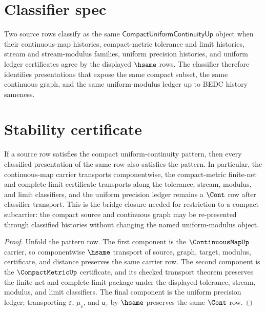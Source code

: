 \section{Classifier spec}
\label{sec:concrete-instances-compact-uniform-continuity-classifier}

\begin{definition}
\label{def:concrete-instances-compact-uniform-continuity-classifier}
Two source rows classify as the same $\mathsf{CompactUniformContinuityUp}$ object when their continuous-map histories, compact-metric tolerance and limit histories, stream and stream-modulus families, uniform precision histories, and uniform ledger certificates agree by the displayed $\hsame$ rows. The classifier therefore identifies presentations that expose the same compact subset, the same continuous graph, and the same uniform-modulus ledger up to BEDC history sameness.
\end{definition}

\section{Stability certificate}
\label{sec:concrete-instances-compact-uniform-continuity-stability}

\begin{theorem}
\label{thm:concrete-instances-compact-uniform-continuity-stability}
If a source row satisfies the compact uniform-continuity pattern, then every classified presentation of the same row also satisfies the pattern. In particular, the continuous-map carrier transports componentwise, the compact-metric finite-net and complete-limit certificate transports along the tolerance, stream, modulus, and limit classifiers, and the uniform precision ledger remains a $\Cont$ row after classifier transport. This is the bridge closure needed for restriction to a compact subcarrier: the compact source and continuous graph may be re-presented through classified histories without changing the named uniform-modulus object.
\end{theorem}

\begin{proof}
Unfold the pattern row. The first component is the $\ContinuousMapUp$ carrier, so componentwise $\hsame$ transport of source, graph, target, modulus, certificate, and distance preserves the same carrier row. The second component is the $\CompactMetricUp$ certificate, and its checked transport theorem preserves the finite-net and complete-limit package under the displayed tolerance, stream, modulus, and limit classifiers. The final component is the uniform precision ledger; transporting $\varepsilon$, $\mu_{\varepsilon}$, and $\mathsf{u}_{\varepsilon}$ by $\hsame$ preserves the same $\Cont$ row.
\end{proof}

